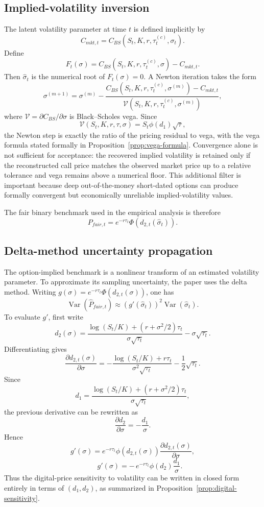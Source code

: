 \documentclass[11pt]{article}
\numberwithin{equation}{section}
\theoremstyle{plain}
\begin{document}
\subsection{Implied-volatility inversion}
The latent volatility parameter at time $t$ is defined implicitly by
\[
C_{mkt,t}=C_{BS}(S_t,K,r,\tau_t^{(c)},\sigma_t).
\]
Define
\[
F_t(\sigma)=C_{BS}(S_t,K,r,\tau_t^{(c)},\sigma)-C_{mkt,t}.
\]
Then $\hat{\sigma}_t$ is the numerical root of $F_t(\sigma)=0$. A Newton iteration takes the form
\[
\sigma^{(m+1)}
=
\sigma^{(m)}
-
\frac{C_{BS}(S_t,K,r,\tau_t^{(c)},\sigma^{(m)})-C_{mkt,t}}
{\mathcal{V}(S_t,K,r,\tau_t^{(c)},\sigma^{(m)})},
\]
where $\mathcal{V}=\partial C_{BS}/\partial \sigma$ is Black--Scholes vega. Since
\[
\mathcal{V}(S_t,K,r,\tau,\sigma)=S_t\phi(d_1)\sqrt{\tau},
\]
the Newton step is exactly the ratio of the pricing residual to vega, with the vega formula stated formally in Proposition~\ref{prop:vega-formula}. Convergence alone is not sufficient for acceptance: the recovered implied volatility is retained only if the reconstructed call price matches the observed market price up to a relative tolerance and vega remains above a numerical floor. This additional filter is important because deep out-of-the-money short-dated options can produce formally convergent but economically unreliable implied-volatility values.

The fair binary benchmark used in the empirical analysis is therefore
\[
P_{fair,t}
=
e^{-r\tau_t}\Phi\!\left(d_{2,t}(\hat{\sigma}_t)\right).
\]

\subsection{Delta-method uncertainty propagation}
The option-implied benchmark is a nonlinear transform of an estimated volatility parameter. To approximate its sampling uncertainty, the paper uses the delta method. Writing $g(\sigma)=e^{-r\tau_t}\Phi(d_{2,t}(\sigma))$, one has
\[
\operatorname{Var}(\widehat{P}_{fair,t})
\approx
\left(g'(\hat{\sigma}_t)\right)^2\operatorname{Var}(\hat{\sigma}_t).
\]
To evaluate $g'$, first write
\[
d_2(\sigma)
=
\frac{\log(S_t/K)+(r+\sigma^2/2)\tau_t}{\sigma\sqrt{\tau_t}}
-\sigma\sqrt{\tau_t}.
\]
Differentiating gives
\[
\frac{\partial d_{2,t}(\sigma)}{\partial \sigma}
=
-\frac{\log(S_t/K)+r\tau_t}{\sigma^2\sqrt{\tau_t}}
-\frac{1}{2}\sqrt{\tau_t}.
\]
Since
\[
d_1
=
\frac{\log(S_t/K)+(r+\sigma^2/2)\tau_t}{\sigma\sqrt{\tau_t}},
\]
the previous derivative can be rewritten as
\[
\frac{\partial d_2}{\partial \sigma}=-\frac{d_1}{\sigma}.
\]
Hence
\[
g'(\sigma)=e^{-r\tau_t}\phi(d_{2,t}(\sigma))\frac{\partial d_{2,t}(\sigma)}{\partial \sigma},
\]
\[
\qquad
g'(\sigma)
=
-\,e^{-r\tau_t}\phi(d_2)\frac{d_1}{\sigma}.
\]
Thus the digital-price sensitivity to volatility can be written in closed form entirely in terms of $(d_1,d_2)$, as summarized in Proposition~\ref{prop:digital-sensitivity}.
\end{document}
